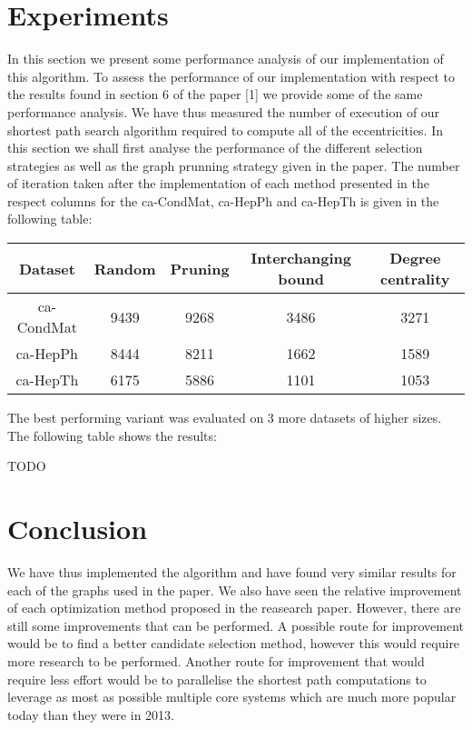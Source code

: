\documentclass[11pt]{article}
\begin{document}
\section{Experiments}
In this section we present some performance analysis of our implementation of
this algorithm. To assess the performance of our implementation with respect to
the results found in section 6 of the paper [1] we provide some of the same
performance analysis. We have thus measured the number of execution of our
shortest path search algorithm required to compute all of the eccentricities. In
this section we shall first analyse the performance of the different selection
strategies as well as the graph prunning strategy given in the paper. The number
of iteration taken after the implementation of each method presented in the
respect columns for the ca-CondMat, ca-HepPh and ca-HepTh is given in the
following table:\\
\begin{center}
 \begin{tabular}{||c c c c c||} 
   \hline
   Dataset & Random & Pruning & Interchanging bound & Degree centrality \\
   \hline\hline
   ca-CondMat & 9439 & 9268 & 3486 & 3271 \\ 
   \hline
   ca-HepPh & 8444 & 8211 & 1662 & 1589 \\
   \hline
   ca-HepTh & 6175 & 5886 & 1101 & 1053 \\
   \hline
 \end{tabular}
\end{center}
\medskip
\noindent
The best performing variant was evaluated on 3 more datasets of higher
sizes. The following table shows the results:\\
\begin{tcolorbox}
  TODO
\end{tcolorbox}
\section{Conclusion}
We have thus implemented the algorithm and have found very similar results for
each of the graphs used in the paper. We also have seen the relative improvement
of each optimization method proposed in the reasearch paper. However, there are
still some improvements that can be performed. A possible route for improvement
would be to find a better candidate selection method, however this would require
more research to be performed. Another route for improvement that would require
less effort would be to parallelise the shortest path computations to leverage
as most as possible multiple core systems which are much more popular today than
they were in 2013.
\end{document}
